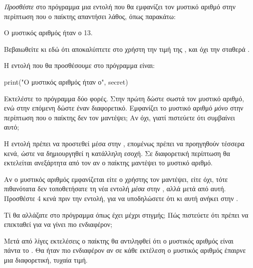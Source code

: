 \documentclass[a4paper,11pt,oneside]{book}
\begin{document}
\begin{step}
\label{step:secret-print}
\emph{Προσθέστε} στο πρόγραμμα μια εντολή που θα εμφανίζει τον μυστικό αριθμό στην περίπτωση που ο παίκτης απαντήσει λάθος, όπως παρακάτω:

\marginnote[16pt]{\iconcomputer}
\begin{pyterm}
Ο μυστικός αριθμός ήταν ο 13.
\end{pyterm}

\begin{note}
Βεβαιωθείτε κι εδώ ότι αποκαλύπτετε στο χρήστη την τιμή της , και όχι την σταθερά .
\end{note}

\begin{answer}
Η εντολή που θα προσθέσουμε στο πρόγραμμα είναι:
	
\begin{pynew}
    print("Ο μυστικός αριθμός ήταν ο", secret)
\end{pynew}
\end{answer}

Εκτελέστε το πρόγραμμα δύο φορές. Στην πρώτη δώστε σωστά τον μυστικό αριθμό, ενώ στην επόμενη δώστε έναν διαφορετικό. Εμφανίζει το μυστικό αριθμό \emph{μόνο} στην περίπτωση που ο παίκτης δεν τον μαντέψει; Αν όχι, γιατί πιστεύετε ότι συμβαίνει αυτό;

\begin{answer}
	Η εντολή πρέπει να προστεθεί μέσα στην , επομένως πρέπει να προηγηθούν τέσσερα κενά, ώστε να δημιουργηθεί η κατάλληλη εσοχή. Σε διαφορετική περίπτωση θα εκτελείται ανεξάρτητα από τον αν ο παίκτης μαντέψει το μυστικό αριθμό.
\end{answer}

\marginnote[16pt]{\iconcaution}
Αν ο μυστικός αριθμός εμφανίζεται είτε ο χρήστης τον μαντέψει, είτε όχι, τότε πιθανότατα δεν τοποθετήσατε τη νέα εντολή \emph{μέσα} στην , αλλά μετά από αυτή. Προσθέστε 4 κενά πριν την εντολή, για να υποδηλώσετε ότι κι αυτή ανήκει στην .

Τί θα αλλάζατε στο πρόγραμμα όπως έχει μέχρι στιγμής; Πώς πιστεύετε ότι πρέπει να επεκταθεί για να γίνει πιο ενδιαφέρον;

\begin{answer}
Μετά από λίγες εκτελέσεις ο παίκτης θα αντιληφθεί ότι ο μυστικός αριθμός είναι πάντα το . Θα ήταν πιο ενδιαφέρον αν σε κάθε εκτέλεση ο μυστικός αριθμός έπαιρνε μια διαφορετική, τυχαία τιμή.
\end{answer}
\end{step}
\end{document}
